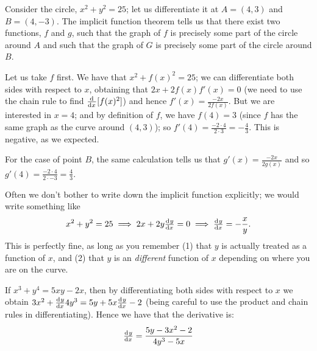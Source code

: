 \begin{ex}
  Consider the circle, $ x^2 + y^2 = 25 $; let us differentiate it at $ A = (4,3) $ and $ B = (4,-3) $. The implicit function theorem tells us that there
  exist two functions, $ f $ and $ g $, such that the graph of $ f $ is precisely some part of the circle around $ A $ and such that the graph of $ G $
  is precisely some part of the circle around $ B $.

  Let us take $ f $ first. We have that $ x^2 + f(x)^2 = 25 $; we can differentiate both sides with respect to $ x $, obtaining that $ 2x + 2f(x) f'(x) = 0 $
  (we need to use the chain rule to find $ \od{}{x} [f(x)^2] $) and hence $ f'(x) = \frac{-2x}{2f(x)} $. But we are interested in $ x = 4 $; and by definition
  of $ f $, we have $ f(4) = 3 $ (since $ f $ has the same graph as the curve around $ (4,3) $); so $ f'(4) = \frac{-2 \cdot 4}{2 \cdot 3} = -\frac{4}{3} $.
  This is negative, as we expected.

  For the case of point $ B $, the same calculation tells us that $ g'(x) = \frac{-2x}{2g(x)} $ and so $ g'(4) = \frac{-2 \cdot 4}{2 \cdot -3} = \frac{4}{3} $.
\end{ex}

Often we don't bother to write down the implicit function explicitly; we would write something like
\begin{displaymath}
  x^2 + y^2 = 25 \implies 2x + 2y \od{y}{x} = 0 \implies \od{y}{x} = -\frac{x}{y}.
\end{displaymath}
This is perfectly fine, as long as you remember (1) that $ y $ is actually treated as a function of $ x $, and (2) that $ y $ is an \emph{different}
function of $ x $ depending on where you are on the curve.

\begin{ex}
  If $ x^3 + y^4 = 5xy - 2x $, then by differentiating both sides with respect to $ x $ we
  obtain $ 3x^2 + \od{y}{x} 4y^3 = 5y + 5x \od{y}{x} - 2 $ (being careful to use the product and chain rules in differentiating). Hence
  we have that the derivative is:
  \begin{displaymath}
    \od{y}{x} = \frac{5y - 3x^2 - 2}{4y^3 - 5x}
  \end{displaymath}
\end{ex}

